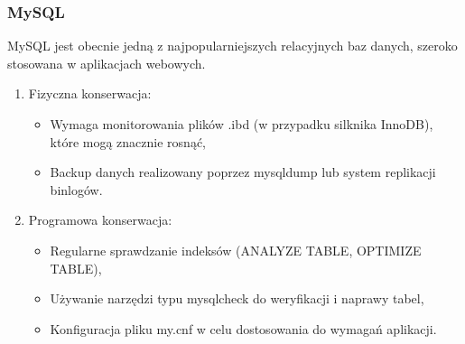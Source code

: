 \documentclass[a4paper,11pt,openany,english]{sphinxmanual}
\begin{document}
\subsubsection{MySQL}
\label{\detokenize{rozdzial2/Kontrola_i_konserwacja/kontrola_i_konserwacja:mysql}}
\sphinxAtStartPar
MySQL jest obecnie jedną z najpopularniejszych relacyjnych baz danych, szeroko stosowana w aplikacjach webowych.
\begin{enumerate}
%
\item {} 
\sphinxAtStartPar
Fizyczna konserwacja:
\begin{itemize}
\item {} 
\sphinxAtStartPar
Wymaga monitorowania plików .ibd (w przypadku silknika InnoDB), które mogą znacznie rosnąć,

\item {} 
\sphinxAtStartPar
Backup danych realizowany poprzez mysqldump lub system replikacji binlogów.

\end{itemize}

\item {} 
\sphinxAtStartPar
Programowa konserwacja:
\begin{itemize}
\item {} 
\sphinxAtStartPar
Regularne sprawdzanie indeksów (ANALYZE TABLE, OPTIMIZE TABLE),

\item {} 
\sphinxAtStartPar
Używanie narzędzi typu mysqlcheck do weryfikacji i naprawy tabel,

\item {} 
\sphinxAtStartPar
Konfiguracja pliku my.cnf w celu dostosowania do wymagań aplikacji.

\end{itemize}

\end{enumerate}
\end{document}
